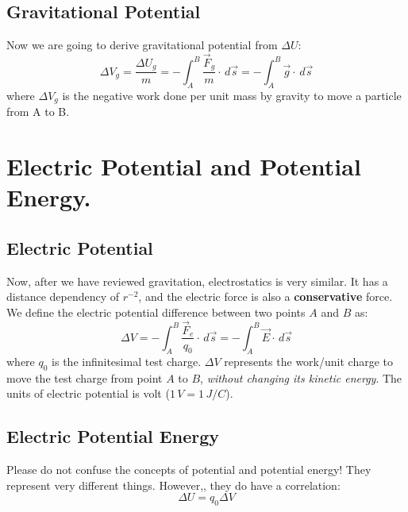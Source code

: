 \documentclass[11pt, letterpaper]{article}
\begin{document}
	\subsection{Gravitational Potential}
	Now we are going to derive gravitational potential from $\Delta U$:
	\begin{equation}\label{eqn:potential}
		\boxed{\Delta V_g = \frac{\Delta U_g}{m} = -\int_A^B \frac{\vec{F}_g}{m}\cdot\, d\vec{s} = 
		-\int_A^B \vec{g}\cdot\, d\vec{s}}
	\end{equation}
	where $\Delta V_g$ is the negative work done per unit mass by gravity to move a particle
	from A to B.
	
	\section{Electric Potential and Potential Energy.}
	\subsection{Electric Potential}
	Now, after we have reviewed gravitation, electrostatics is very similar. It has a distance
	dependency of $r^{-2}$,  and the electric force is also a \textbf{conservative} force. We define
	the electric potential difference between two points $A$ and $B$ as:
	\begin{equation}\label{eqn:electric-pot}
		\boxed{\Delta V=-\int_A^B \frac{\vec{F}_e}{q_0}\cdot\, d\vec{s}=-\int_A^B \vec{E}\cdot\, d
		\vec{s}}
	\end{equation}
	where $q_0$ is the infinitesimal test charge. $\Delta V$ represents the work/unit charge to 
	move the test charge from point $A$ to $B$, \textit{without changing its kinetic energy}. The 
	units of electric potential is volt ($1\, V = 1\, J/C$).
	
	\subsection{Electric Potential Energy}
	Please do not confuse the concepts of potential and potential energy! They represent very
	different things. However,, they do have a correlation:
	\begin{equation}\label{eqn:electric-pot-energy}
		\boxed{\Delta U=q_0\Delta V}
	\end{equation}
	
	\newpage	
\end{document}
